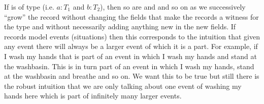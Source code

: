 If  is of type  (i.e. $a:T_1$ and $b:T_2$), then so are  and
 and so on as we successively ``grow'' the record without
changing the fields that make the records a witness for the type and
without necessarily adding anything new in the new fields. If records
model events (situations) then this corresponds to the intuition that given any event there will always be a
larger event of which it is a part.  For example, if I wash my hands that
is part of an event in which I wash my hands and stand at the
washbasin.  This is in turn part of an event in which I wash my hands,
stand at the washbasin and breathe and so on.  We want this to be true
but still there is the robust intuition that we are only talking about
one event of washing my hands here which is part of infinitely many
larger events.

